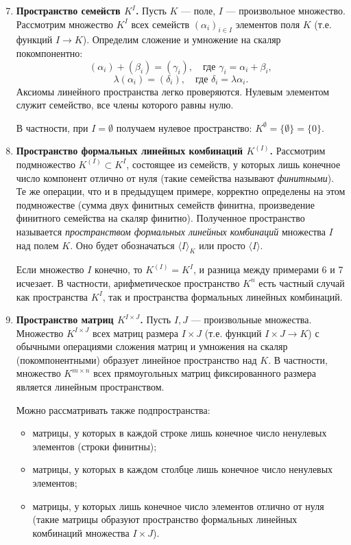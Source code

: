 \documentclass[a4paper,12pt]{article}
\theoremstyle{definition}
\theoremstyle{plain}
\theoremstyle{remark}
\begin{document}
	\begin{enumerate}
		\setcounter{enumi}{6}
		\item \textbf{Пространство семейств \(K^I\).} Пусть \(K\) — поле, \(I\) — произвольное множество. Рассмотрим множество \(K^I\) всех семейств \((\alpha_i)_{i \in I}\) элементов поля \(K\) (т.е. функций \(I \to K\)). Определим сложение и умножение на скаляр покомпонентно:
		\[
		(\alpha_i) + (\beta_i) = (\gamma_i), \quad \text{где } \gamma_i = \alpha_i + \beta_i,
		\]
		\[
		\lambda (\alpha_i) = (\delta_i), \quad \text{где } \delta_i = \lambda \alpha_i.
		\]
		Аксиомы линейного пространства легко проверяются. Нулевым элементом служит семейство, все члены которого равны нулю.
		
		В частности, при \(I = \emptyset\) получаем нулевое пространство: \(K^\emptyset = \{\emptyset\} = \{0\}\).
		
		\item \textbf{Пространство формальных линейных комбинаций \(K^{(I)}\).} Рассмотрим подмножество \(K^{(I)} \subset K^I\), состоящее из семейств, у которых лишь конечное число компонент отлично от нуля (такие семейства называют \textit{финитными}). Те же операции, что и в предыдущем примере, корректно определены на этом подмножестве (сумма двух финитных семейств финитна, произведение финитного семейства на скаляр финитно). Полученное пространство называется \textit{пространством формальных линейных комбинаций} множества \(I\) над полем \(K\). Оно будет обозначаться \(\langle I \rangle_K\) или просто \(\langle I \rangle\).
		
		Если множество \(I\) конечно, то \(K^{(I)} = K^I\), и разница между примерами 6 и 7 исчезает. В частности, арифметическое пространство \(K^n\) есть частный случай как пространства \(K^I\), так и пространства формальных линейных комбинаций.
		
		\item \textbf{Пространство матриц \(K^{I \times J}\).} Пусть \(I, J\) — произвольные множества. Множество \(K^{I \times J}\) всех матриц размера \(I \times J\) (т.е. функций \(I \times J \to K\)) с обычными операциями сложения матриц и умножения на скаляр (покомпонентными) образует линейное пространство над \(K\). В частности, множество \(K^{m \times n}\) всех прямоугольных матриц фиксированного размера является линейным пространством.
		
		Можно рассматривать также подпространства:
		\begin{itemize}
			\item матрицы, у которых в каждой строке лишь конечное число ненулевых элементов (строки финитны);
			\item матрицы, у которых в каждом столбце лишь конечное число ненулевых элементов;
			\item матрицы, у которых лишь конечное число элементов отлично от нуля (такие матрицы образуют пространство формальных линейных комбинаций множества \(I \times J\)).
		\end{itemize}
	\end{enumerate}
	
\end{document}
